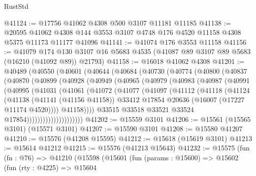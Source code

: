 \begin{lexlean}{RustStd}
\begin{coremodule}
@41124 := @17756 @41062 @4308 @500 @3107 @11181 @11185
@41138 := @20595
    @41062
    @4308
    @144
    @3553
    @3107
    @4748
    @176
    @4520
    @11158
    @4308
    @5375
    @11173
    @11177
    @41096
@41141 := @41074 @176 @3553 @11158
@41156 := @41079
    @174
    @130
    @3107
    @16
    @5683
    @4535
    (@41087 @89 @3107 @89 @5683 (@16210 (@41092 @89)) @21793)
@41158 := @16018 @41062 @4308
@41201 := @40489
    (@40550
      (@40601
        (@40644
          (@40684
            (@40730
              (@40774
                (@40800
                  (@40837
                    (@40870
                      (@40899
                        (@40928
                          (@40949
                            (@40965
                              (@40979
                                (@40983
                                  (@40987
                                    (@40991
                                      (@40995
                                        (@41031
                                          (@41061
                                            (@41072
                                              (@41077
                                                (@41097
                                                  (@41112
                                                    (@41118
                                                      (@41124
                                                        (@41138
                                                          (@41141 (@41156 @41158))
                                                          @33412
                                                          @17854
                                                          @20636
                                                          (@16007 (@17227 @11174 @4520))))
                                                      @41158))))
                                              @33515
                                              @33518
                                              @33521
                                              @33524
                                              @17854)))))))))))))))))))))
@41202 := @15559 @3101
@41206 := @15561 (@15565 @3101) (@15571 @3101)
@41207 := @15590 @3101
@41208 := @15580 @41207
@41210 := @15576 (@41208 @15595)
@41212 := @15618 (@15619 @3101)
@41213 := @15614 @41212
@41215 := @15576 (@41213 @15643)
@41232 := @15575
    (fun (fn : @76) =>
    @41210
      (@15598
        (@15601
          (fun (params : @15600) =>
          @15602
            (fun (rty : @4225) =>
            @15604

\end{coremodule}
\end{lexlean}
